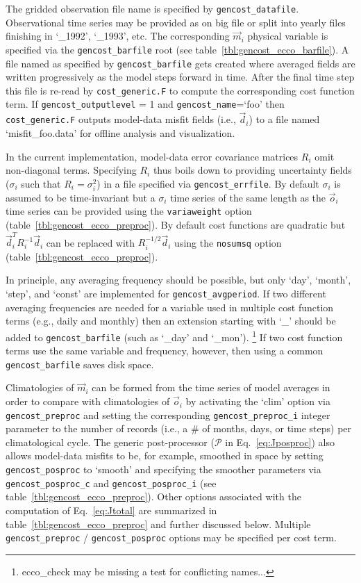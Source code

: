  \noindent
The gridded observation file name is specified by \texttt{gencost\_datafile}. Observational time series may be provided as on big file or split into yearly files finishing in `\_1992', `\_1993', etc. The corresponding $\vec{m}_i$ physical variable is specified via the \texttt{gencost\_barfile} root (see table~\ref{tbl:gencost_ecco_barfile}). A file named as specified by \texttt{gencost\_barfile} gets created where averaged fields are written progressively as the model steps forward in time. After the final time step this file is re-read by \texttt{cost\_generic.F} to compute the corresponding cost function term. If \texttt{gencost\_outputlevel} = 1 and \texttt{gencost\_name}=`foo' then \texttt{cost\_generic.F} outputs model-data misfit fields (i.e., $\vec{d}_i$) to a file named `misfit\_foo.data' for offline analysis and visualization.

In the current implementation, model-data error covariance matrices $R_i$ omit non-diagonal terms. Specifying $R_i$ thus boils down to providing uncertainty fields ($\sigma_i$ such that $R_i=\sigma_i^2$) in a file specified via \texttt{gencost\_errfile}. By default $\sigma_i$ is assumed to be time-invariant but a $\sigma_i$ time series of the same length as the $\vec{o}_i$ time series can be provided using the \texttt{variaweight} option (table~\ref{tbl:gencost_ecco_preproc}). By default cost functions are quadratic but $\vec{d}_i^T R_i^{-1} \vec{d}_i$ can be replaced with $R_i^{-1/2} \vec{d}_i$ using the \texttt{nosumsq} option (table~\ref{tbl:gencost_ecco_preproc}). 

In principle, any averaging frequency should be possible, but only {`day'}, {`month'}, {`step'}, and {`const'} are implemented for \texttt{gencost\_avgperiod}. If two different averaging frequencies are needed for a variable used in multiple cost function terms (e.g., daily and monthly) then an extension starting with `\_' should be added to \texttt{gencost\_barfile} (such as `\_day' and `\_mon'). \footnote{ecco\_check may be missing a test for conflicting names...} If two cost function terms use the same variable and frequency, however, then using a common \texttt{gencost\_barfile} saves disk space. 

Climatologies of $\vec{m}_i$ can be formed from the time series of model averages in order to compare with climatologies of $\vec{o}_i$ by activating the `clim' option via \texttt{gencost\_preproc} and setting the corresponding \texttt{gencost\_preproc\_i}  integer parameter to the number of records (i.e., a \# of months, days, or time steps) per climatological cycle. The generic post-processor ($\mathcal{P}$ in Eq.~\eqref{eq:Jposproc}) also allows model-data misfits to be, for example, smoothed in space by setting \texttt{gencost\_posproc} to {`smooth'} and specifying the smoother parameters via \texttt{gencost\_posproc\_c} and \texttt{gencost\_posproc\_i} (see table~\ref{tbl:gencost_ecco_preproc}). Other options associated with the computation of Eq.~\eqref{eq:Jtotal} are summarized in table~\ref{tbl:gencost_ecco_preproc} and further discussed below. Multiple \texttt{gencost\_preproc} / \texttt{gencost\_posproc} options may be specified per cost term. 

